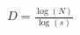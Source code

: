 \documentclass[preview]{standalone}
\begin{document}
\begin{align*}
D = \frac{\log(N)}{\log(s)}
\end{align*}
\end{document}
